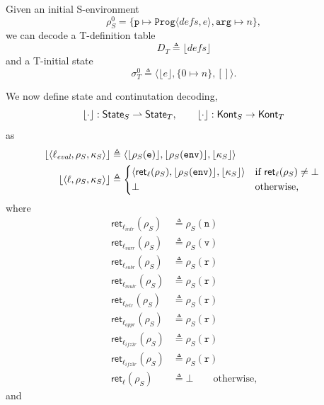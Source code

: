 \documentclass[11pt]{article}
\begin{document}
Given an initial S-environment \[\rho_S^0 = \{\texttt{p} \mapsto \texttt{Prog}\langle \textit{defs}, e \rangle, \texttt{arg} \mapsto n \},\] we can decode a T-definition table \[D_T \triangleq \lfloor \textit{defs} \rfloor\] and a T-initial state \[\sigma_T^0 \triangleq \langle \lfloor e \rfloor, \{0 \mapsto n\}, []\rangle.\]

We now define state and continutation decoding,
\[
  \lfloor \cdot \rfloor : \textsf{State}_S \rightharpoonup \textsf{State}_T, \qquad \lfloor \cdot \rfloor : \textsf{Kont}_S \to \textsf{Kont}_T
\]
as
\begin{align*}
  \lfloor \langle \ell_{\textit{eval}}, \rho_S, \kappa_S \rangle \rfloor &\triangleq \langle \lfloor \rho_S(\texttt{e})\rfloor, \lfloor \rho_S(\texttt{env}) \rfloor, \lfloor \kappa_S \rfloor \rangle \\
  \lfloor \langle \ell, \rho_S, \kappa_S \rangle \rfloor
  &\triangleq
  \begin{cases*}
    \langle \textsf{ret}_\ell(\rho_S), \lfloor \rho_S(\texttt{env}) \rfloor, \lfloor \kappa_S \rfloor \rangle
      & if $\textsf{ret}_\ell(\rho_S) \ne \bot$ \\
    \bot
      & otherwise,
  \end{cases*}
\end{align*}
where
\begin{align*}
  \textsf{ret}_{\ell_{\textit{intr}}}(\rho_S) &\triangleq \rho_S(\texttt{n}) \\
  \textsf{ret}_{\ell_{\textit{varr}}}(\rho_S) &\triangleq \rho_S(\texttt{v}) \\
  \textsf{ret}_{\ell_{\textit{subr}}}(\rho_S) &\triangleq \rho_S(\texttt{r}) \\
  \textsf{ret}_{\ell_{\textit{mulr}}}(\rho_S) &\triangleq \rho_S(\texttt{r}) \\
  \textsf{ret}_{\ell_{\textit{letr}}}(\rho_S) &\triangleq \rho_S(\texttt{r}) \\
  \textsf{ret}_{\ell_{\textit{appr}}}(\rho_S) &\triangleq \rho_S(\texttt{r}) \\
  \textsf{ret}_{\ell_{\textit{ifz2r}}}(\rho_S) &\triangleq \rho_S(\texttt{r}) \\
  \textsf{ret}_{\ell_{\textit{ifz3r}}}(\rho_S) &\triangleq \rho_S(\texttt{r}) \\
  \textsf{ret}_{\ell}(\rho_S) &\triangleq \bot \qquad\text{otherwise,}
\end{align*}
and
\end{document}

